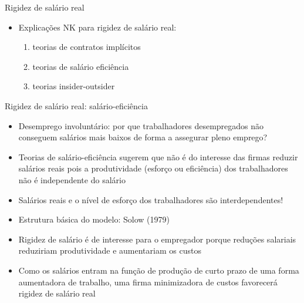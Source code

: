 \documentclass[10pt]{beamer}
\begin{document}
\begin{frame}{Rigidez de salário real}
    \begin{itemize}
        \item Explicações NK para rigidez de salário real:\bigskip
        \begin{enumerate}
            \item teorias de contratos implícitos\bigskip
            \item teorias de salário eficiência\bigskip
            \item teorias insider-outsider
        \end{enumerate}
    \end{itemize}
\end{frame}

\begin{frame}{Rigidez de salário real: salário-eficiência}
    \begin{itemize}
        \item Desemprego involuntário: por que trabalhadores desempregados não conseguem salários mais baixos de forma a assegurar pleno emprego?\bigskip
        \item Teorias de salário-eficiência sugerem que não é do interesse das firmas reduzir salários reais pois a produtividade (esforço ou eficiência) dos trabalhadores não é independente do salário\bigskip
        \item Salários reais e o nível de esforço dos trabalhadores são interdependentes!\bigskip
        \item Estrutura básica do modelo: Solow (1979)\bigskip
        \item Rigidez de salário é de interesse para o empregador porque reduções salariais reduziriam produtividade e aumentariam os custos\bigskip
        \item Como os salários entram na função de produção de curto prazo de uma forma aumentadora de trabalho, uma firma minimizadora de custos favorecerá rigidez de salário real
    \end{itemize}
\end{frame}
\end{document}
